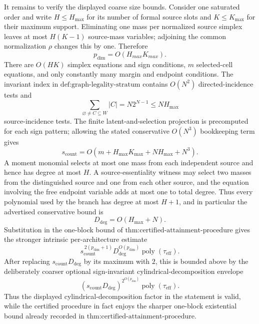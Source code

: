 It remains to verify the displayed coarse size bounds.  Consider one saturated order and write \(H\le H_{\max}\) for its number of formal source slots and \(K\le K_{\max}\) for their maximum support.  Eliminating one mass per normalized source simplex leaves at most \(H(K-1)\) source-mass variables; adjoining the common normalization \(\rho\) changes this by one.  Therefore
\[
 p_{\mathrm{dim}}=O(H_{max}K_{max}).
\]
There are \(O(HK)\) simplex equations and sign conditions, \(m\) selected-cell equations, and only constantly many margin and endpoint conditions.  The invariant index in \(\text{def:graph-legality-stratum}\) contains \(O(N^2)\) directed-incidence tests and
\[
 \sum_{\varnothing\ne C\subseteq W}|C|
 =N2^{N-1}
 \le NH_{\max}
\]
source-incidence tests.  The finite latent-and-selection projection is precomputed for each sign pattern; allowing the stated conservative \(O(N^3)\) bookkeeping term gives
\[
 s_{\mathrm{count}}
 =O\!\left(m+H_{\max}K_{\max}+NH_{\max}+N^3\right).
\]
A moment monomial selects at most one mass from each independent source and hence has degree at most \(H\).  A source-essentiality witness may select two masses from the distinguished source and one from each other source, and the equation involving the free endpoint variable adds at most one to total degree.  Thus every polynomial used by the branch has degree at most \(H+1\), and in particular the advertised conservative bound is
\[
 D_{\mathrm{deg}}=O(H_{\max}+N).
\]
Substitution in the one-block bound of \(\text{thm:certified-attainment-procedure}\) gives the stronger intrinsic per-architecture estimate
\[
 s_{\mathrm{count}}^{\,2(p_{\mathrm{dim}}+1)}
 D_{\mathrm{deg}}^{O(p_{\mathrm{dim}})}
 \operatorname{poly}(\tau_{\mathrm{eff}}).
\]
After replacing \(s_{\mathrm{count}}D_{\mathrm{deg}}\) by its maximum with \(2\), this is bounded above by the deliberately coarser optional sign-invariant cylindrical-decomposition envelope
\[
 (s_{\mathrm{count}}D_{\mathrm{deg}})^{2^{O(p_{\mathrm{dim}})}}
 \operatorname{poly}(\tau_{\mathrm{eff}}).
\]
Thus the displayed cylindrical-decomposition factor in the statement is valid, while the certified procedure in fact enjoys the sharper one-block existential bound already recorded in \(\text{thm:certified-attainment-procedure}\).
